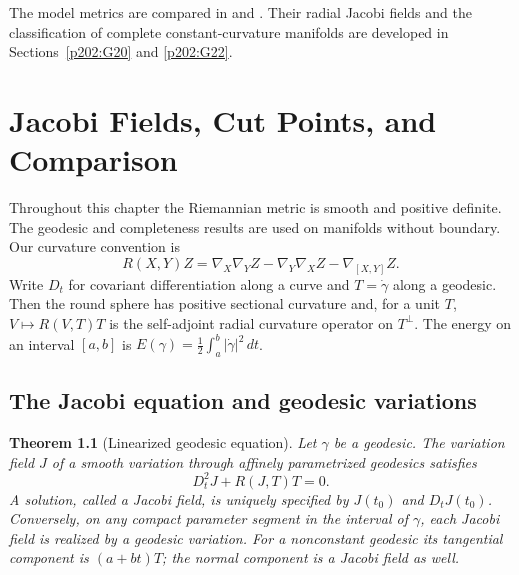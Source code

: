 \documentclass[11pt,oneside,openany]{book}
\theoremstyle{plain}
\newtheorem{theorem}{Theorem}[chapter]
\theoremstyle{definition}
\theoremstyle{remark}
\begin{document}
The model metrics are compared in \cite[Chapters 3 and 5]{LeeRM}
and \cite[Chapter 8]{dC}. Their radial Jacobi fields and the
classification of complete constant-curvature manifolds are
developed in Sections~\ref{p202:G20} and \ref{p202:G22}.
\chapter{Jacobi Fields, Cut Points, and Comparison}
\label{ch:p202-jacobi-comparison}

Throughout this chapter the Riemannian metric is smooth and
positive definite. The geodesic and completeness results are used
on manifolds without boundary. Our curvature convention is
\[
 R(X,Y)Z=\nabla_X\nabla_YZ-\nabla_Y\nabla_XZ-\nabla_{[X,Y]}Z.
\]
Write \(D_t\) for covariant differentiation along a curve and
\(T=\dot\gamma\) along a geodesic. Then the round sphere has positive
sectional curvature and, for a unit \(T\), \(V\mapsto R(V,T)T\)
is the self-adjoint radial curvature operator on \(T^\perp\).
The energy on an interval \([a,b]\) is
\(E(\gamma)=\frac12\int_a^b|\dot\gamma|^2\,dt\).

\section{The Jacobi equation and geodesic variations}
\label{p202:G16}

\begin{theorem}[Linearized geodesic equation]\label{thm:p202-jacobi-variation}
Let \(\gamma\) be a geodesic. The variation field \(J\) of a smooth
variation through affinely parametrized geodesics satisfies
\[
 D_t^2J+R(J,T)T=0.
\]
A solution, called a Jacobi field, is uniquely specified by
\(J(t_0)\) and \(D_tJ(t_0)\). Conversely, on any compact parameter
segment in the interval of \(\gamma\), each Jacobi field is realized
by a geodesic variation. For a nonconstant geodesic its tangential
component is \((a+bt)T\); the normal component is a Jacobi field
as well.
\end{theorem}
\end{document}
